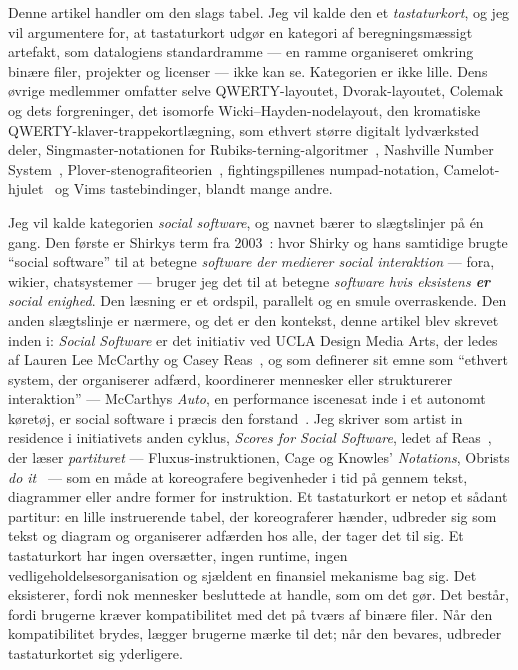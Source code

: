 \documentclass[10pt,letterpaper,twocolumn]{article}
\begin{document}
Denne artikel handler om den slags tabel. Jeg vil kalde den et \emph{tastaturkort}, og jeg vil argumentere for, at tastaturkort udgør en kategori af beregningsmæssigt artefakt, som datalogiens standardramme --- en ramme organiseret omkring binære filer, projekter og licenser --- ikke kan se. Kategorien er ikke lille. Dens øvrige medlemmer omfatter selve QWERTY-layoutet, Dvorak-layoutet, Colemak og dets forgreninger, det isomorfe Wicki--Hayden-nodelayout, den kromatiske QWERTY-klaver-trappekortlægning, som ethvert større digitalt lydværksted deler, Singmaster-notationen for Rubiks-terning-algoritmer~\citep{singmaster1981notes}, Nashville Number System~\citep{matthews1984nashville}, Plover-stenografiteorien~\citep{knight2010plover}, fightingspillenes numpad-notation, Camelot-hjulet~\citep{davis1991camelot} og Vims tastebindinger, blandt mange andre.

Jeg vil kalde kategorien \emph{social software}, og navnet bærer to slægtslinjer på én gang. Den første er Shirkys term fra 2003~\citep{shirky2003etech,allen2004socialsoftware}: hvor Shirky og hans samtidige brugte ``social software'' til at betegne \emph{software der medierer social interaktion} --- fora, wikier, chatsystemer --- bruger jeg det til at betegne \emph{software hvis eksistens \textbf{er} social enighed}. Den læsning er et ordspil, parallelt og en smule overraskende. Den anden slægtslinje er nærmere, og det er den kontekst, denne artikel blev skrevet inden i: \emph{Social Software} er det initiativ ved UCLA Design\,\textbar\,Media Arts, der ledes af Lauren Lee McCarthy og Casey Reas~\citep{sosoft_info}, og som definerer sit emne som ``ethvert system, der organiserer adfærd, koordinerer mennesker eller strukturerer interaktion'' --- McCarthys \emph{Auto}, en performance iscenesat inde i et autonomt køretøj, er social software i præcis den forstand~\citep{mccarthy2026auto}. Jeg skriver som artist in residence i initiativets anden cyklus, \emph{Scores for Social Software}, ledet af Reas~\citep{reas2026scores}, der læser \emph{partituret} --- Fluxus-instruktionen, Cage og Knowles' \emph{Notations}, Obrists \emph{do it}~\citep{cage1969notations,obrist1997doit} --- som en måde at koreografere begivenheder i tid på gennem tekst, diagrammer eller andre former for instruktion. Et tastaturkort er netop et sådant partitur: en lille instruerende tabel, der koreograferer hænder, udbreder sig som tekst og diagram og organiserer adfærden hos alle, der tager det til sig. Et tastaturkort har ingen oversætter, ingen runtime, ingen vedligeholdelsesorganisation og sjældent en finansiel mekanisme bag sig. Det eksisterer, fordi nok mennesker besluttede at handle, som om det gør. Det består, fordi brugerne kræver kompatibilitet med det på tværs af binære filer. Når den kompatibilitet brydes, lægger brugerne mærke til det; når den bevares, udbreder tastaturkortet sig yderligere.
\end{document}
